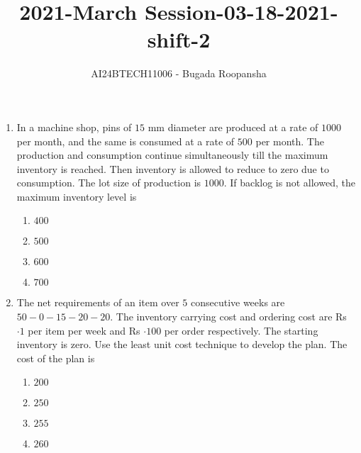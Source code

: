 \documentclass[journal,12pt,twocolumn]{IEEEtran}
\theoremstyle{remark}
\begin{document}
                        
                        \vspace{3cm}
                        \title{2021-March Session-03-18-2021-shift-2}
                        \author{AI24BTECH11006 - Bugada Roopansha}
                        \maketitle
                        \begin{enumerate}[start=69]
                        \item In a machine shop, pins of $15$ mm diameter are produced at a rate of $1000$ per month, and the same is consumed at a rate of $500$ per month. The production and consumption continue simultaneously till the maximum inventory is reached. Then inventory is allowed to reduce to zero due to consumption. The lot size of production is $1000$. If backlog is not allowed, the maximum inventory level is
                        \begin{enumerate}
                            \item $400$
                            \item $500$
                            \item $600$
                            \item $700$
                        \end{enumerate}
                        \item The net requirements of an item over $5$ consecutive weeks are $50-0-15-20-20$. The inventory carrying cost and ordering cost are Rs $\cdot1$ per item per week and Rs $\cdot100$ per order respectively. The starting inventory is zero. Use the least unit cost technique to develop the plan. The cost of the plan  is
                            \begin{enumerate}
                                \item $200$
                                \item $250$
                                \item $255$
                                \item $260$
                            \end{enumerate}

\end{enumerate}
\end{document}
